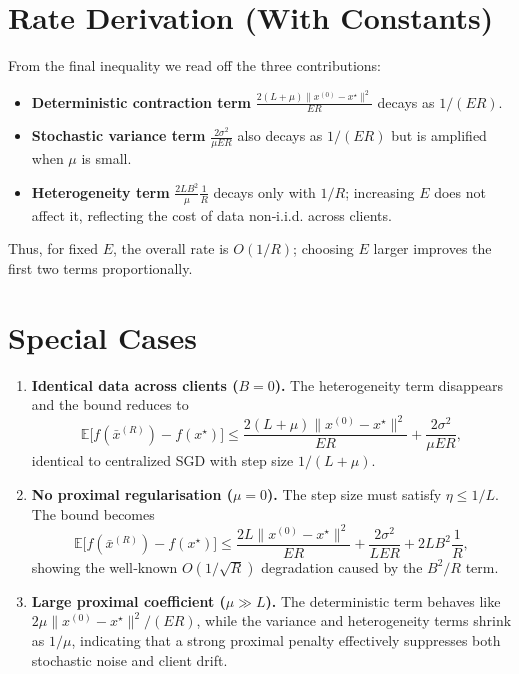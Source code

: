 \documentclass{article}
\newcommand{\E}{\mathbb{E}}
\begin{document}
\section*{Rate Derivation (With Constants)}
From the final inequality we read off the three contributions:
\begin{itemize}
\item \textbf{Deterministic contraction term} $\displaystyle \frac{2(L+\mu)\|x^{(0)}-x^\star\|^2}{ER}$ decays as $1/(ER)$.
\item \textbf{Stochastic variance term} $\displaystyle \frac{2\sigma^2}{\mu ER}$ also decays as $1/(ER)$ but is amplified when $\mu$ is small.
\item \textbf{Heterogeneity term} $\displaystyle \frac{2L B^2}{\mu}\frac{1}{R}$ decays only with $1/R$; increasing $E$ does not affect it, reflecting the cost of data non‑i.i.d. across clients.
\end{itemize}
Thus, for fixed $E$, the overall rate is $O(1/R)$; choosing $E$ larger improves the first two terms proportionally.

\section*{Special Cases}
\begin{enumerate}
\item \textbf{Identical data across clients ($B=0$).}  
The heterogeneity term disappears and the bound reduces to
\[
\E\big[f(\bar{x}^{(R)})-f(x^\star)\big]\le
\frac{2(L+\mu)\|x^{(0)}-x^\star\|^2}{ER}
+\frac{2\sigma^2}{\mu ER},
\]
identical to centralized SGD with step size $1/(L+\mu)$.
\item \textbf{No proximal regularisation ($\mu=0$).}  
The step size must satisfy $\eta\le 1/L$. The bound becomes
\[
\E\big[f(\bar{x}^{(R)})-f(x^\star)\big]\le
\frac{2L\|x^{(0)}-x^\star\|^2}{ER}
+\frac{2\sigma^2}{L ER}
+2L B^2\frac{1}{R},
\]
showing the well‑known $O(1/\sqrt{R})$ degradation caused by the $B^2/R$ term.
\item \textbf{Large proximal coefficient ($\mu\gg L$).}  
The deterministic term behaves like $2\mu\|x^{(0)}-x^\star\|^2/(ER)$, while the variance and heterogeneity terms shrink as $1/\mu$, indicating that a strong proximal penalty effectively suppresses both stochastic noise and client drift.
\end{enumerate}
\end{document}

